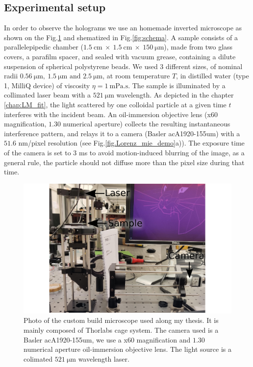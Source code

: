 \subsection{Experimental setup}
\label{chap:exp-setup}
In order to observe the holograms we use an homemade inverted microscope as shown on the Fig.\ref{fig:picture} and shematized in Fig.\ref{fig:schema}. A sample consists of a parallelepipedic chamber ($1.5 ~ \text{cm} ~ \times ~ 1.5 ~ \text{cm} ~ \times ~ 150 ~ \mathrm{\mu m} $), made from two glass covers, a parafilm spacer, and sealed with vacuum grease, containing a dilute suspension of spherical polystyrene beads. We used 3 different sizes, of nominal radii $0.56 ~ \mathrm{\mu m}, ~ 1.5 ~ \mathrm{\mu m} \text{ and } 2.5 ~ \mathrm{\mu m} $, at room temperature $T$, in distilled water (type 1, MilliQ device) of viscosity $\eta = 1 ~ \mathrm{mPa.s}$. The sample is illuminated by a collimated laser beam with a $521 ~ \mathrm{\mu m}$ wavelength. As depicted in the chapter \ref{chap:LM_fit}, the light scattered by one colloidal particle at a given time $t$ interferes with the incident beam. An oil-immersion objective lens (x60 magnification, $1.30$ numerical aperture) collects the resulting instantaneous interference pattern, and relays it to a camera (Basler acA1920-155um) with a $51.6$ nm/pixel resolution (see Fig.\ref{fig.Lorenz_mie_demo}a)). The exposure time of the camera is set to $3$ ms to avoid motion-induced blurring of the image, as a general rule, the particle should not diffuse more than the pixel size during that time.

\begin{figure}[h!]
	\centering
	\includegraphics{02_body/chapter2/images/figures_setup/photo_setup.pdf}
	\caption{Photo of the custom build microscope used along my thesis. It is mainly composed of Thorlabs cage system. The camera used is a Basler acA1920-155um, we use a x60 magnification and $1.30$ numerical aperture oil-immersion objective lens. The light source is a colimated  $521 ~ \mathrm{\mu m}$ wavelength laser.}
	\label{fig:picture}
\end{figure}

